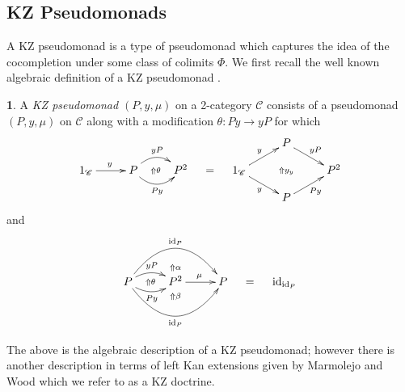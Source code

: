 \documentclass[a4paper,oneside,english]{amsart}
\numberwithin{equation}{section}
\numberwithin{figure}{section}
\theoremstyle{plain}
\theoremstyle{definition}
\newtheorem{defn}[thm]{\protect\definitionname}
\theoremstyle{remark}
\theoremstyle{definition}
\theoremstyle{plain}
\theoremstyle{plain}
\theoremstyle{plain}
\providecommand{\definitionname}{Definition}
\begin{document}
\subsection{KZ Pseudomonads}

A KZ pseudomonad is a type of pseudomonad which captures the idea
of the cocompletion under some class of colimits $\Phi$. We first
recall the well known algebraic definition of a KZ pseudomonad \cite{kock1972}. 
\begin{defn}
\label{defkzpseudomonad} A \emph{KZ pseudomonad $\left(P,y,\mu\right)$
}on a 2-category $\mathscr{C}$ consists of a pseudomonad $\left(P,y,\mu\right)$
on $\mathscr{C}$ along with a modification $\theta\colon Py\to yP$
for which
\[
\xymatrix@=1em{ &  &  &  &  &  &  &  & P\ar[rrd]^{yP}\\
1_{\mathscr{C}}\ar[rr]^{y} &  & P\ar@/^{1pc}/[rr]^{yP}\ar@/_{1pc}/[rr]_{Py}\ar@{}[rr]|-{\Uparrow\theta} &  & P^{2} & = & 1_{\mathscr{C}}\ar[rru]^{y}\ar[rrd]_{y} &  & \ar@{}[]|-{\Uparrow y_{y}} &  & P^{2}\\
 &  &  &  &  &  &  &  & P\ar[rru]_{Py}
}
\]
and
\[
\xymatrix@=1em{\\
 &  & \ar@{}[d]|-{\Uparrow\alpha}\\
P\ar@/^{0.7pc}/[rr]^{yP}\ar@/_{0.7pc}/[rr]_{Py}\ar@{}[rr]|-{\Uparrow\theta}\ar@/^{2.5pc}/[rrrr]^{\textnormal{id}_{P}}\ar@/_{2.5pc}/[rrrr]_{\textnormal{id}_{P}} &  & P^{2}\ar[rr]^{\mu} &  & P & = & \textnormal{id}_{\textnormal{id}_{P}}\\
 &  & \ar@{}[u]|-{\Uparrow\beta}\\
\\
}
\]

\end{defn}
The above is the algebraic description of a KZ pseudomonad; however
there is another description in terms of left Kan extensions given
by Marmolejo and Wood \cite{marm2012} which we refer to as a KZ doctrine.
\end{document}
